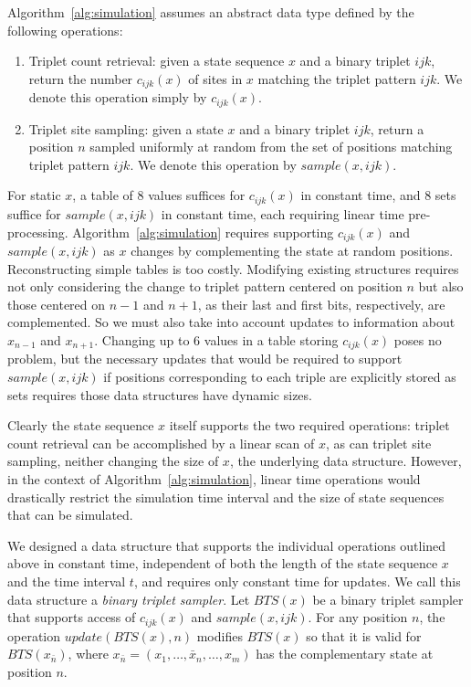 \documentclass[11pt]{article}
\begin{document}
Algorithm~\ref{alg:simulation} assumes an abstract data type defined
by the following operations:
\begin{enumerate}
\item Triplet count retrieval: given a state sequence $x$ and a binary
  triplet $ijk$, return the number $c_{ijk}(x)$ of sites in $x$
  matching the triplet pattern $ijk$. We denote this operation simply
  by $c_{ijk}(x)$.
\item Triplet site sampling: given a state $x$ and a binary triplet
  $ijk$, return a position $n$ sampled uniformly at random from the
  set of positions matching triplet pattern $ijk$. We denote this
  operation by $\mathit{sample}(x, ijk)$.
\end{enumerate}
For static $x$, a table of 8 values suffices for $c_{ijk}(x)$ in
constant time, and 8 sets suffice for $\mathit{sample}(x, ijk)$ in
constant time, each requiring linear time
pre-processing. Algorithm~\ref{alg:simulation} requires supporting
$c_{ijk}(x)$ and $\mathit{sample}(x, ijk)$ as $x$ changes by
complementing the state at random positions. Reconstructing simple
tables is too costly. Modifying existing structures requires not only
considering the change to triplet pattern centered on position $n$ but
also those centered on $n-1$ and $n+1$, as their last and first bits,
respectively, are complemented. So we must also take into account
updates to information about $x_{n-1}$ and $x_{n+1}$. Changing up to 6
values in a table storing $c_{ijk}(x)$ poses no problem, but the
necessary updates that would be required to support
$\mathit{sample}(x, ijk)$ if positions corresponding to each triple
are explicitly stored as sets requires those data structures have
dynamic sizes.

Clearly the state sequence $x$ itself supports the two required
operations: triplet count retrieval can be accomplished by a linear
scan of $x$, as can triplet site sampling, neither changing the size
of $x$, the underlying data structure. However, in the context of
Algorithm~\ref{alg:simulation}, linear time operations would
drastically restrict the simulation time interval and the size of
state sequences that can be simulated.

We designed a data structure that supports the individual operations
outlined above in constant time, independent of both the length of the
state sequence $x$ and the time interval $t$, and requires only
constant time for updates. We call this data structure a {\it binary
  triplet sampler}. Let $\mathit{BTS}(x)$ be a binary triplet sampler
that supports access of $c_{ijk}(x)$ and $\mathit{sample}(x,ijk)$. For
any position $n$, the operation $\mathit{update}(\mathit{BTS}(x), n)$
modifies $\mathit{BTS}(x)$ so that it is valid for
$\mathit{BTS}(x_{\bar{n}})$, where
$x_{\bar{n}} = (x_1,\ldots,\bar{x}_n,\ldots,x_m)$ has the
complementary state at position $n$.
\end{document}
